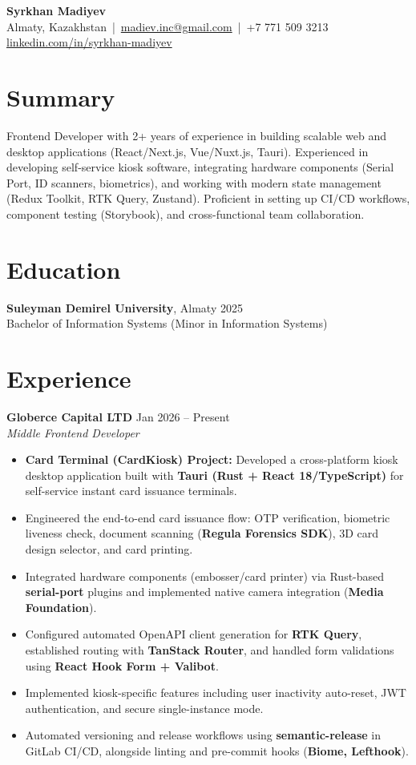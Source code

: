 \documentclass[a4paper,10pt]{article}
\begin{document}
\begin{center}
  {\LARGE \textbf{Syrkhan Madiyev}} \\[4pt]
  Almaty, Kazakhstan \,|\, 
  \href{mailto:madiev.inc@gmail.com}{madiev.inc@gmail.com} \,|\, +7 771 509 3213 \\
  \href{https://www.linkedin.com/in/syrkhan-madiyev-5b7a11291/}{linkedin.com/in/syrkhan-madiyev}
\end{center}

\section*{Summary}
Frontend Developer with 2+ years of experience in building scalable web and desktop applications (React/Next.js, Vue/Nuxt.js, Tauri). Experienced in developing self-service kiosk software, integrating hardware components (Serial Port, ID scanners, biometrics), and working with modern state management (Redux Toolkit, RTK Query, Zustand). Proficient in setting up CI/CD workflows, component testing (Storybook), and cross-functional team collaboration.

\section*{Education}
\textbf{Suleyman Demirel University}, Almaty \hfill 2025 \\
Bachelor of Information Systems (Minor in Information Systems)

\section*{Experience}
\textbf{Globerce Capital LTD} \hfill Jan 2026 – Present \\
\textit{Middle Frontend Developer}
\begin{itemize}
  \item \textbf{Card Terminal (CardKiosk) Project:} Developed a cross-platform kiosk desktop application built with \textbf{Tauri (Rust + React 18/TypeScript)} for self-service instant card issuance terminals.
  \item Engineered the end-to-end card issuance flow: OTP verification, biometric liveness check, document scanning (\textbf{Regula Forensics SDK}), 3D card design selector, and card printing.
  \item Integrated hardware components (embosser/card printer) via Rust-based \textbf{serial-port} plugins and implemented native camera integration (\textbf{Media Foundation}).
  \item Configured automated OpenAPI client generation for \textbf{RTK Query}, established routing with \textbf{TanStack Router}, and handled form validations using \textbf{React Hook Form + Valibot}.
  \item Implemented kiosk-specific features including user inactivity auto-reset, JWT authentication, and secure single-instance mode.
  \item Automated versioning and release workflows using \textbf{semantic-release} in GitLab CI/CD, alongside linting and pre-commit hooks (\textbf{Biome, Lefthook}).
\end{itemize}
\end{document}

